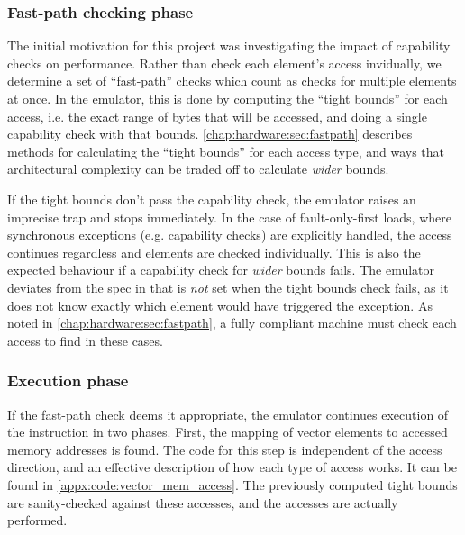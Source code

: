 \subsubsection{Fast-path checking phase}\label{chap:hardware:subsec:checking}
The initial motivation for this project was investigating the impact of capability checks on performance.
Rather than check each element's access invidually, we determine a set of \enquote{fast-path} checks which count as checks for multiple elements at once.
In the emulator, this is done by computing the \enquote{tight bounds} for each access, i.e. the exact range of bytes that will be accessed, and doing a single capability check with that bounds.
\cref{chap:hardware:sec:fastpath} describes methods for calculating the \enquote{tight bounds} for each access type, and ways that architectural complexity can be traded off to calculate \emph{wider} bounds.


If the tight bounds don't pass the capability check, the emulator raises an imprecise trap and stops immediately.
In the case of fault-only-first loads, where synchronous exceptions (e.g. capability checks) are explicitly handled, the access continues regardless and elements are checked individually.
This is also the expected behaviour if a capability check for \emph{wider} bounds fails.
The emulator deviates from the spec in that  is \emph{not} set when the tight bounds check fails, as it does not know exactly which element would have triggered the exception.
As noted in \cref{chap:hardware:sec:fastpath}, a fully compliant machine must check each access to find  in these cases.

\subsubsection{Execution phase}\label{chap:hardware:subsec:execution}
If the fast-path check deems it appropriate, the emulator continues execution of the instruction in two phases.
First, the mapping of vector elements to accessed memory addresses is found.
The code for this step is independent of the access direction, and an effective description of how each type of access works.
It can be found in \cref{appx:code:vector_mem_access}.
The previously computed tight bounds are sanity-checked against these accesses, and the accesses are actually performed.

